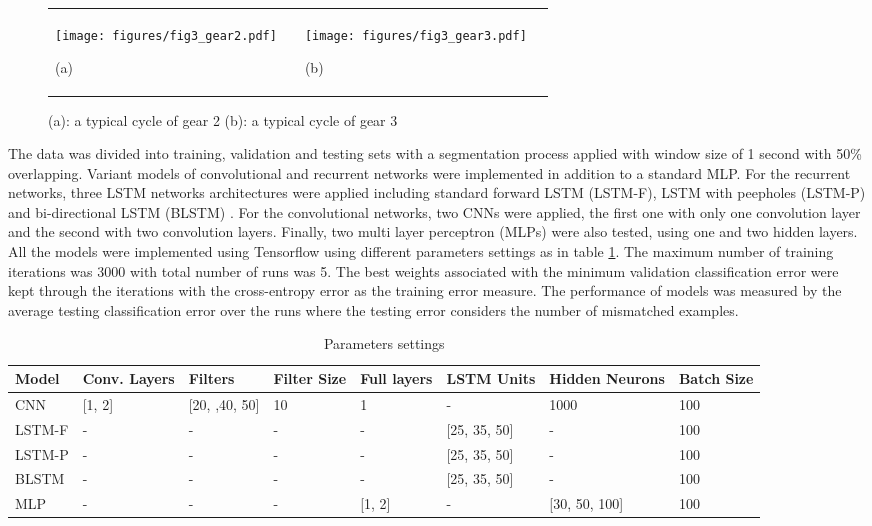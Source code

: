 \documentclass[12pt,a4paper]{article}
\begin{document}
\begin{figure}[h!]
\centering
\begin{tabular}{ p{6cm} p{1cm} p{6cm} p{1cm}}
\texttt{[image: figures/fig3\_gear2.pdf]}{\begin{center}(a)\end{center} } && \texttt{[image: figures/fig3\_gear3.pdf]}{\begin{center}(b)\end{center} }&  \\
\end{tabular}
\caption{(a): a typical cycle of gear 2 (b): a typical cycle of gear  3}
\label{examples}
\end{figure}

The data was divided into training, validation and testing sets with a segmentation process applied with window size of 1 second with 50\% overlapping. Variant models of convolutional and recurrent networks were implemented in addition to a standard MLP. For the recurrent networks, three LSTM networks architectures were applied including standard forward LSTM (LSTM-F), LSTM with peepholes (LSTM-P) and bi-directional LSTM (BLSTM) . For the convolutional networks, two CNNs were applied, the first one with only one convolution layer and the second with two convolution layers.  Finally, two multi layer perceptron (MLPs) were also tested, using one and two hidden layers. All the models were implemented using Tensorflow using different parameters settings as in table \ref{exp. results}. The maximum number of training iterations was 3000 with total number of runs was 5. The best weights associated with the minimum validation classification error were kept through the iterations with the cross-entropy error as the training error measure. The performance of models was measured by the average testing classification error over the runs where the testing error considers the number of mismatched examples.

\begin{table}
\small
\caption{ Parameters settings}\label{exp. results}
\begin{center}
\begin{tabular}{ |p{1.3cm}| p{1.5cm} p{2cm} p{1cm} p{1cm} p{1.5cm} p{1.8cm} p{1cm}|}
\hline
Model & Conv. Layers &Filters & Filter Size & Full layers & LSTM Units & Hidden Neurons & Batch Size \\
\hline
CNN & [1, 2]&[20, ,40, 50] &10 &1 & - & 1000&100\\
\hline
LSTM-F &- & - & -  & - & [25, 35, 50] &   - &100\\
\hline
LSTM-P &- & - & -  & - & [25, 35, 50] &   - &100\\
\hline
BLSTM & -& - & -  & - & [25, 35, 50] &  - &100\\
\hline
MLP& -& - & -  & [1, 2] & - & [30, 50, 100] &100\\
\hline
\end{tabular}
\end{center}
\end{table}
\end{document}
